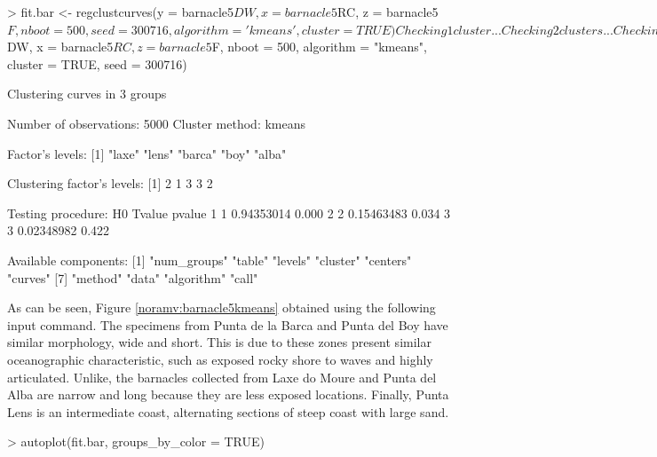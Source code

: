 \begin{example}
> fit.bar <- regclustcurves(y = barnacle5$DW, x = barnacle5$RC, z = barnacle5$F,
               nboot = 500, seed = 300716, algorithm = 'kmeans', cluster = TRUE)
               
Checking 1 cluster... 
Checking 2 clusters... 
Checking 3 clusters... 

Finally, there are 3 clusters. 

> summary(fit.bar)

Call:  
regclustcurves(y = barnacle5$DW, x = barnacle5$RC, z = barnacle5$F, 
    nboot = 500, algorithm = "kmeans", cluster = TRUE, seed = 300716)

Clustering curves in 3 groups

Number of observations:  5000
Cluster method:  kmeans 

Factor's levels:
[1] "laxe"  "lens"  "barca" "boy"   "alba" 

Clustering factor's levels:
[1] 2 1 3 3 2


Testing procedure:
  H0     Tvalue pvalue
1  1 0.94353014  0.000
2  2 0.15463483  0.034
3  3 0.02348982  0.422

Available components:
 [1] "num_groups" "table"      "levels"     "cluster"    "centers"    "curves"    
 [7] "method"     "data"       "algorithm"  "call"
\end{example}





As can be seen, Figure \ref{noramv:barnacle5kmeans} obtained using the following input command. The specimens from Punta de la Barca and Punta del Boy have similar morphology, wide and short. This is due to these zones present similar oceanographic characteristic, such as exposed rocky shore to waves and highly articulated. Unlike, the barnacles collected from Laxe do Moure and Punta del Alba are narrow and long because they are less exposed locations. Finally, Punta Lens is an intermediate coast, alternating sections of steep coast with large sand. 



\begin{example}
> autoplot(fit.bar, groups_by_color = TRUE)
\end{example}





